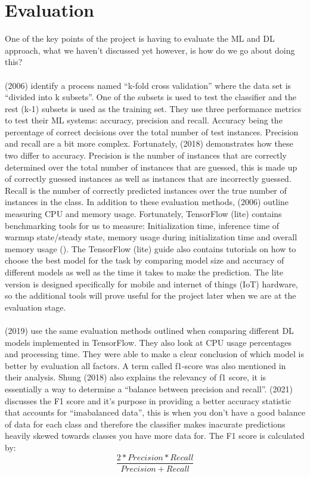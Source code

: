 \documentclass{article}
\begin{document}
\section{Evaluation}
One of the key points of the project is having to evaluate the ML and DL approach, what we haven’t discussed 
yet however, is how do we go about doing this?
\\
\\
\citeauthor{10.1145/1163593.1163596} (2006) identify a process named “k-fold cross validation” where the data set is “divided 
into k subsets”. One of the subsets is used to test the classifier and the rest (k-1) subsets is used as the training 
set. They use three performance metrics to test their ML systems: accuracy, precision and recall. Accuracy being the 
percentage of correct decisions over the total number of test instances. Precision and recall are a bit more complex. 
Fortunately, \citeauthor{shung2018} (2018) demonstrates how these two differ to accuracy. Precision is the number of instances that are 
correctly determined over the total number of instances that are guessed, this is made up of correctly guessed instances
 as well as instances that are incorrectly guessed. Recall is the number of correctly predicted instances over the true 
 number of instances in the class. In addition to these evaluation methods, \citeauthor{10.1145/1163593.1163596} (2006) 
 outline measuring CPU and memory usage. Fortunately, TensorFlow (lite) contains benchmarking tools for us to measure: 
 Initialization time, inference time of warmup state/steady state, memory usage during initialization time and overall 
 memory usage (\cite{googleTF}). The TensorFlow (lite) guide also contains tutorials on how to choose the best model for 
 the task by comparing model size and accuracy of different models as well as the time it takes to make the prediction. 
 The lite version is designed specifically for mobile and internet of things (IoT) hardware, so the additional tools 
 will prove useful for the project later when we are at the evaluation stage.
 \\
 \\
 \citeauthor{Chockwanich} (2019) use the same evaluation methods outlined when comparing different DL models 
 implemented in TensorFlow. They also look at CPU usage percentages and processing time. They were able to make a clear 
 conclusion of which model is better by evaluation all factors. A term called f1-score was also mentioned in their 
 analysis. Shung (2018) also explains the relevancy of f1 score, it is essentially a way to determine a “balance between
  precision and recall”. \citeauthor{kors2021} (2021) discusses the F1 score and it’s purpose in providing a better accuracy 
  statistic that accounts for “imabalanced data”, this is when you don’t have a good balance of data for each class and 
  therefore the classifier makes inacurate predictions heavily skewed towards classes you have more data for. The F1 
  score is calculated by:
\[\frac{2*Precision*Recall}{Precision + Recall}\]
\end{document}
